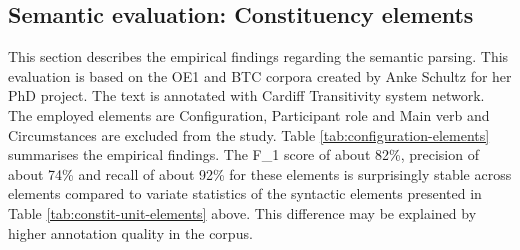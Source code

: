 \subsection{Semantic evaluation: Constituency elements}
This section describes the empirical findings regarding the semantic parsing. This evaluation is based on the OE1 and BTC corpora created by Anke Schultz for her PhD project. The text is annotated with Cardiff Transitivity system network. The employed elements are Configuration, Participant role and Main verb and Circumstances are excluded from the study. Table \ref{tab:configuration-elements} summarises the empirical findings. The F_1 score of about 82\%, precision of about 74\% and recall of about 92\% for these elements is surprisingly stable across elements compared to variate statistics of the syntactic elements presented in Table \ref{tab:constit-unit-elements} above. This difference may be explained by higher annotation quality in the corpus. 

\begin{table}[!ht]
    \caption{The evaluation statistics for the main semantic elements}
    \label{tab:configuration-elements}
\end{table}

